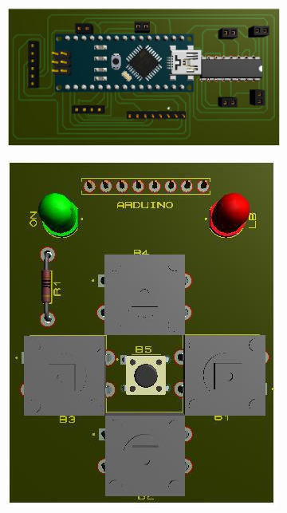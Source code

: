\begin{figure}[!htbp]
    \centering
    \begin{subfigure}[b]{.6\linewidth}
        \centering
        \includegraphics[width=\textwidth]{assets/conception1/img84.jpg}
    \end{subfigure}
    \hfill
    \begin{subfigure}[b]{.39\linewidth}
        \centering
        \includegraphics[width=\textwidth]{assets/conception1/img85.jpg}
    \end{subfigure}
\end{figure}

